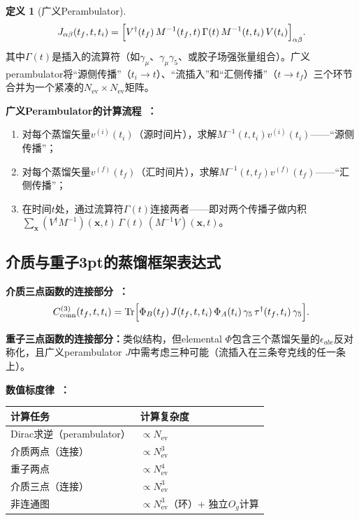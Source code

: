 \documentclass[12pt,a4paper]{ctexart}
\theoremstyle{definition}
\newtheorem{definition}{定义}[section]
\begin{document}
\begin{definition}[广义Perambulator]\label{def:gen_perambulator}
\begin{equation}
    J_{\alpha\beta}(t_f, t, t_i) = \Bigl[ V^\dagger(t_f)\,M^{-1}(t_f, t)\,\Gamma(t)\,M^{-1}(t, t_i)\,V(t_i) \Bigr]_{\alpha\beta}.
\end{equation}
其中$\Gamma(t)$是插入的流算符（如$\gamma_\mu$、$\gamma_\mu\gamma_5$、或胶子场强张量组合）。广义perambulator将``源侧传播''（$t_i \to t$）、``流插入''和``汇侧传播''（$t \to t_f$）三个环节合并为一个紧凑的$N_{\text{ev}} \times N_{\text{ev}}$矩阵。
\end{definition}

\textbf{广义Perambulator的计算流程~\cite{wickContraction2026}：}
\begin{enumerate}[leftmargin=*]
    \item 对每个蒸馏矢量$v^{(i)}(t_i)$（源时间片），求解$M^{-1}(t, t_i) v^{(i)}(t_i)$——``源侧传播''；
    \item 对每个蒸馏矢量$v^{(f)}(t_f)$（汇时间片），求解$M^{-1}(t, t_f) v^{(f)}(t_f)$——``汇侧传播''；
    \item 在时间$t$处，通过流算符$\Gamma(t)$连接两者——即对两个传播子做内积$\sum_{\mathbf{x}} (V^\dagger M^{-1})(\mathbf{x}, t)\,\Gamma(t)\,(M^{-1}V)(\mathbf{x}, t)$。
\end{enumerate}

\subsection{介质与重子3pt的蒸馏框架表达式}

\textbf{介质三点函数的连接部分~\cite{distillation2026}：}
\begin{equation}\label{eq:meson_3pt_dist}
    C_{\text{conn}}^{(3)}(t_f, t, t_i) =
    \operatorname{Tr}\Bigl[ \Phi_B(t_f)\,J(t_f, t, t_i)\,\Phi_A(t_i)\,\gamma_5\,\tau^\dagger(t_f, t_i)\,\gamma_5 \Bigr].
\end{equation}

\textbf{重子三点函数的连接部分：}类似结构，但elemental $\Phi$包含三个蒸馏矢量的$\epsilon_{abc}$反对称化，且广义perambulator $J$中需考虑三种可能（流插入在三条夸克线的任一条上）。

\textbf{数值标度律~\cite{wickContraction2026}：}
\begin{center}
\begin{tabular}{ll}
\toprule
\textbf{计算任务} & \textbf{计算复杂度} \\
\midrule
Dirac求逆（perambulator） & $\propto N_{\text{ev}}$ \\
介质两点（连接） & $\propto N_{\text{ev}}^3$ \\
重子两点 & $\propto N_{\text{ev}}^4$ \\
介质三点（连接） & $\propto N_{\text{ev}}^3$ \\
非连通图 & $\propto N_{\text{ev}}^3$（环）+ 独立$O_g$计算 \\
\bottomrule
\end{tabular}
\end{center}
\end{document}
